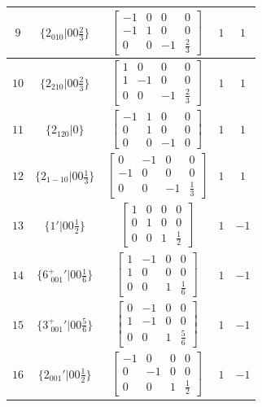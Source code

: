 \documentclass[fleqn,8pt]{jsarticle}
\begin{document}
\begin{longtable}{ccccc}
$ 9 $ & $ \{2{}_{010}|0 0 \frac{2}{3}\} $ & $ \begin{bmatrix} -1 & 0 & 0 & 0 \\ -1 & 1 & 0 & 0 \\ 0 & 0 & -1 & \frac{2}{3} \end{bmatrix} $ & $ 1 $ & $ 1 $ \\ \hline
$ 10 $ & $ \{2{}_{210}|0 0 \frac{2}{3}\} $ & $ \begin{bmatrix} 1 & 0 & 0 & 0 \\ 1 & -1 & 0 & 0 \\ 0 & 0 & -1 & \frac{2}{3} \end{bmatrix} $ & $ 1 $ & $ 1 $ \\ \hline
$ 11 $ & $ \{2{}_{120}|0\} $ & $ \begin{bmatrix} -1 & 1 & 0 & 0 \\ 0 & 1 & 0 & 0 \\ 0 & 0 & -1 & 0 \end{bmatrix} $ & $ 1 $ & $ 1 $ \\ \hline
$ 12 $ & $ \{2{}_{1-10}|0 0 \frac{1}{3}\} $ & $ \begin{bmatrix} 0 & -1 & 0 & 0 \\ -1 & 0 & 0 & 0 \\ 0 & 0 & -1 & \frac{1}{3} \end{bmatrix} $ & $ 1 $ & $ 1 $ \\ \hline
$ 13 $ & $ \{1{}'|0 0 \frac{1}{2}\} $ & $ \begin{bmatrix} 1 & 0 & 0 & 0 \\ 0 & 1 & 0 & 0 \\ 0 & 0 & 1 & \frac{1}{2} \end{bmatrix} $ & $ 1 $ & $ -1 $ \\ \hline
$ 14 $ & $ \{6^{+}_{\,\,001}{}'|0 0 \frac{1}{6}\} $ & $ \begin{bmatrix} 1 & -1 & 0 & 0 \\ 1 & 0 & 0 & 0 \\ 0 & 0 & 1 & \frac{1}{6} \end{bmatrix} $ & $ 1 $ & $ -1 $ \\ \hline
$ 15 $ & $ \{3^{+}_{\,\,001}{}'|0 0 \frac{5}{6}\} $ & $ \begin{bmatrix} 0 & -1 & 0 & 0 \\ 1 & -1 & 0 & 0 \\ 0 & 0 & 1 & \frac{5}{6} \end{bmatrix} $ & $ 1 $ & $ -1 $ \\ \hline
$ 16 $ & $ \{2{}_{001}{}'|0 0 \frac{1}{2}\} $ & $ \begin{bmatrix} -1 & 0 & 0 & 0 \\ 0 & -1 & 0 & 0 \\ 0 & 0 & 1 & \frac{1}{2} \end{bmatrix} $ & $ 1 $ & $ -1 $ \\ \hline

\end{longtable}
\end{document}
